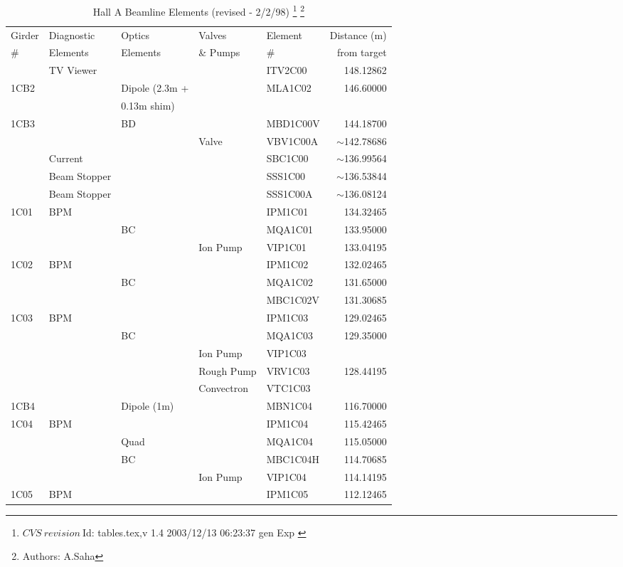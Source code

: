 
\begin{table}[hp]
\caption[Beamline: Hall A Beamline Elements]{Hall A Beamline Elements (revised - 2/2/98)
\footnote{
  $CVS~revision~ $Id: tables.tex,v 1.4 2003/12/13 06:23:37 gen Exp $ $
}
\footnote{Authors: A.Saha }
}
\label{beam_tab1}


\begin{tabular}{lllllr}
Girder & Diagnostic & Optics & Valves & Element & Distance (m) \\
\# & Elements & Elements & \& Pumps & \# & from target \\ \hline
& TV Viewer &&&ITV2C00 & 148.12862 \\ 
1CB2 & & Dipole (2.3m + & & MLA1C02 & 146.60000 \\
&&0.13m shim) &&& \\
1CB3 && BD && MBD1C00V & 144.18700 \\
&&&Valve & VBV1C00A & $\sim$142.78686 \\
& Current &&& SBC1C00 & $\sim$136.99564 \\
& Beam Stopper &&& SSS1C00 & $\sim$136.53844 \\
& Beam Stopper &&& SSS1C00A & $\sim$136.08124 \\
1C01 & BPM &&& IPM1C01 & 134.32465 \\
&& BC && MQA1C01 & 133.95000 \\
&&& Ion Pump & VIP1C01 & 133.04195 \\
1C02 & BPM &&& IPM1C02 & 132.02465 \\
&& BC && MQA1C02 & 131.65000 \\
&&&& MBC1C02V & 131.30685 \\
1C03 & BPM &&& IPM1C03 & 129.02465 \\
&& BC && MQA1C03 & 129.35000 \\
&&& Ion Pump & VIP1C03 & \\
&&& Rough Pump & VRV1C03 & 128.44195 \\
&&& Convectron & VTC1C03 & \\
1CB4 && Dipole (1m) && MBN1C04 & 116.70000 \\
1C04 & BPM &&& IPM1C04 & 115.42465 \\
&& Quad && MQA1C04 & 115.05000 \\
&& BC && MBC1C04H & 114.70685 \\
&&& Ion Pump & VIP1C04 & 114.14195 \\
1C05 & BPM &&& IPM1C05 & 112.12465 \\

\end{tabular}
\end{table}
